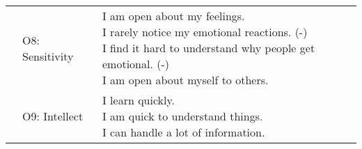 \documentclass[]{article}
\begin{document}
\begin{longtable}[t]{lll}
\addlinespace
 & O8: Sensitivity & \makecell[l]{I am open about my feelings.\\I rarely notice my emotional reactions. (-)\\I find it hard to understand why people get emotional. (-)\\I am open about myself to others.}\\
\addlinespace
 & O9: Intellect & \makecell[l]{I learn quickly.\\I am quick to understand things.\\I can handle a lot of information.}\\*
\end{longtable}
\end{document}
